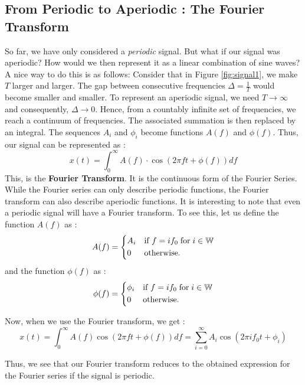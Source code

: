 \documentclass{article}
\theoremstyle{definition}
\begin{document}
	 \subsection{From Periodic to Aperiodic : The Fourier Transform}
	 So far, we have only considered a \textit{periodic} signal. But what if our signal was aperiodic? How would we then represent it as a linear combination of sine waves? A nice way to do this is as follows: 
	 Consider that in Figure \ref{fig:signal1}, we make $T$ larger and larger. The gap between consecutive frequencies $\Delta = \frac{1}{T}$ would become smaller and smaller. To represent an aperiodic signal, we need $T \rightarrow \infty$ and consequently, $\Delta \rightarrow 0$. Hence, from a countably infinite set of frequencies, we reach a continuum of frequencies. The associated summation is then replaced by an integral. The sequences $A_i$ and $\phi_i$ become functions $A(f)$ and $\phi(f)$. Thus, our signal can be represented as : 
	 \[x(t) = \int_{0}^{\infty} A(f) \cdot \cos(2\pi ft+\phi(f)) df \]
	 This, is the \textbf{Fourier Transform}. It is the continuous form of the Fourier Series. While the Fourier series can only describe periodic functions, the Fourier transform can also describe aperiodic functions. It is interesting to note that even a periodic signal will have a Fourier transform. To see this, let us define the function $A(f)$ as : 
	 \[
	 	A(f) = 
	 	\begin{dcases}
        A_i & \text{if} \ f = if_0 \; \text{for} \; i \in \mathbb{W} \\
        0 & \text{otherwise.} \\
   		\end{dcases}
	 \]
	 and the function $\phi(f)$ as : 
	  \[
	 	\phi(f) = 
	 	\begin{dcases}
        \phi_i & \text{if} \ f = if_0 \; \text{for} \; i \in \mathbb{W} \\
        0 & \text{otherwise.} \\
   		\end{dcases}
	 \]
	 
	 Now, when we use the Fourier transform, we get : 
	 \[ 
	 x(t) = \int_{0}^{\infty} A(f) \cos(2\pi ft + \phi(f)) df = \sum_{i=0}^{\infty} A_i \cos(2\pi if_0t + \phi_i) \]
	 
	 Thus, we see that our Fourier transform reduces to the obtained expression for the Fourier series if the signal is periodic. 
	 
\end{document}
